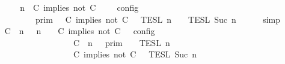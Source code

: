 \begin{isabellebody}
%
\isadelimproof
%
\endisadelimproof
%
\isatagproof
{}\isamarkupfalse%
\ {\isacharminus}\isanewline
\ \ \isamarkupfalse%
\ {\isacartoucheopen}{\isasymlbrakk}\ {\isasymGamma}{\isacharcomma}\ n\ {\isasymTurnstile}\ {\isacharparenleft}C\ implies\ not\ C\ {\isacharhash}\ {\isasymPsi}\ {\isasymtriangleright}\ {\isasymPhi}\ {\isasymrbrakk}\isactrlsub c\isactrlsub o\isactrlsub n\isactrlsub f\isactrlsub i\isactrlsub g\isanewline
\ \ \ \ \ \ \ \ {\isacharequal}\ {\isasymlbrakk}{\isasymlbrakk}\ {\isasymGamma}\ {\isasymrbrakk}{\isasymrbrakk}\isactrlsub p\isactrlsub r\isactrlsub i\isactrlsub m\ {\isasyminter}\ {\isasymlbrakk}{\isasymlbrakk}\ {\isacharparenleft}C\ implies\ not\ C\ {\isacharhash}\ {\isasymPsi}\ {\isasymrbrakk}{\isasymrbrakk}\isactrlsub T\isactrlsub E\isactrlsub S\isactrlsub L\isactrlbsup {\isasymge}\ n\isactrlesup \ {\isasyminter}\ {\isasymlbrakk}{\isasymlbrakk}\ {\isasymPhi}\ {\isasymrbrakk}{\isasymrbrakk}\isactrlsub T\isactrlsub E\isactrlsub S\isactrlsub L\isactrlbsup {\isasymge}\ Suc\ n\isactrlesup {\isacartoucheclose}\isanewline
\ \ \ \ \isamarkupfalse%
\ simp\isanewline
\ \ \isamarkupfalse%
\ \isamarkupfalse%
\ {\isacartoucheopen}{\isasymlbrakk}\ {\isacharparenleft}{\isacharparenleft}C\ {\isasymnot}{\isasymUp}\ n{\isacharparenright}\ {\isacharhash}\ {\isasymGamma}{\isacharparenright}{\isacharcomma}\ n\ {\isasymTurnstile}\ {\isasymPsi}\ {\isasymtriangleright}\ {\isacharparenleft}{\isacharparenleft}C\ implies\ not\ C\ {\isacharhash}\ {\isasymPhi}{\isacharparenright}\ {\isasymrbrakk}\isactrlsub c\isactrlsub o\isactrlsub n\isactrlsub f\isactrlsub i\isactrlsub g\isanewline
\ \ \ \ \ \ \ \ \ \ \ \ \ \ \ \ \ \ {\isacharequal}\ {\isasymlbrakk}{\isasymlbrakk}\ {\isacharparenleft}C\ {\isasymnot}{\isasymUp}\ n{\isacharparenright}\ {\isacharhash}\ {\isasymGamma}\ {\isasymrbrakk}{\isasymrbrakk}\isactrlsub p\isactrlsub r\isactrlsub i\isactrlsub m\ {\isasyminter}\ {\isasymlbrakk}{\isasymlbrakk}\ {\isasymPsi}\ {\isasymrbrakk}{\isasymrbrakk}\isactrlsub T\isactrlsub E\isactrlsub S\isactrlsub L\isactrlbsup {\isasymge}\ n\isactrlesup \isanewline
\ \ \ \ \ \ \ \ \ \ \ \ \ \ \ \ \ \ {\isasyminter}\ {\isasymlbrakk}{\isasymlbrakk}\ {\isacharparenleft}C\ implies\ not\ C\ {\isacharhash}\ {\isasymPhi}\ {\isasymrbrakk}{\isasymrbrakk}\isactrlsub T\isactrlsub E\isactrlsub S\isactrlsub L\isactrlbsup {\isasymge}\ Suc\ n\isactrlesup {\isacartoucheclose}\ \isamarkupfalse%

\end{isabellebody}
